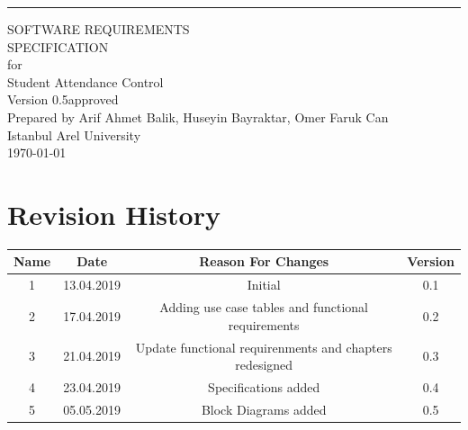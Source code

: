 \documentclass{scrreprt}
\date{}
\def\myversion{0.5}
\begin{document}
\begin{flushright}
    \rule{16cm}{5pt}\vskip1cm
    \begin{bfseries}
        \Huge{SOFTWARE REQUIREMENTS\\ SPECIFICATION}\\
        \vspace{1.9cm}
        for\\
        \vspace{1.9cm}
        Student Attendance Control\\
        \vspace{1.9cm}
        \LARGE{Version \myversion approved}\\
        \vspace{1.9cm}
        Prepared by Arif Ahmet Balik, Huseyin Bayraktar, Omer Faruk Can\\
        \vspace{1.9cm}
        Istanbul Arel University\\
        \vspace{1cm}
        \today\\
    \end{bfseries}
\end{flushright}

\tableofcontents


\chapter*{Revision History}

\begin{center}

    \begin{tabular}{|c|c|c|c|}
        \hline
	    Name & Date & Reason For Changes & Version\\
        \hline
	    1 & 13.04.2019 & Initial & 0.1\\

        \hline
	    2 & 17.04.2019 & Adding use case tables 
and functional requirements & 0.2\\
        \hline
	    3 & 21.04.2019 & Update functional requirenments and chapters redesigned & 0.3\\
        \hline
          4 & 23.04.2019 & Specifications added & 0.4\\
        \hline
	5 & 05.05.2019 & Block Diagrams added & 0.5\\
        \hline
    \end{tabular}
\end{center}
\end{document}
